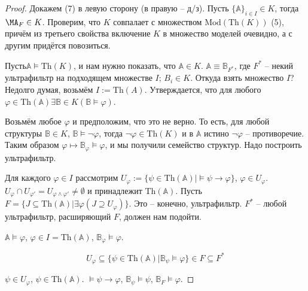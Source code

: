 \begin{proof}
    Докажем (7) в левую сторону (в правую -- д/з). Пусть $\{\mathbb{A}\}_{i \in I} \in K$, тогда $\MA_F \in K$. Проверим, что $K$ совпалает с множеством $\text{Mod}(\text{Th}(K))$ (5), причём из третьего свойства включение $K$ в множество моделей очевидно, а с другим придётся повозиться. \ 
    
    Пусть$\mathbb{A}\models \text{Th}(K)$, и нам нужно показать, что $\mathbb{A}\in K$. $\mathbb{A}\equiv \mathbb{B}_{F^*}$, где $F^*$ -- некий ультрафильтр на подходящем множестве $I$; $B_i \in K$. Откуда взять множество $I$? Недолго думая, возьмём $I:= \text{Th}(A)$. Утверждается, что для любого $\varphi \in \text{Th}(\mathbb{A}) \exists \mathbb{B} \in K (\mathbb{B} \models \varphi)$. \ 

    Возьмём любое $\varphi$ и предположим, что это не верно. То есть, для любой структуры $\mathbb{B} \in K$, $\mathbb{B} \models \neg \varphi$, тогда $\neg \varphi \in \text{Th}(K)$ и в $\mathbb{A}$ истино $\neg \varphi$ -- противоречие. Таким образом $\varphi \mapsto \mathbb{B}_\varphi \models \varphi$, и мы получили семейство структур. Надо построить ультрафильтр. \ 
    
    Для каждого $\varphi \in I$ рассмотрим $U_{\varphi} := \{\psi \in \text{Th}(\mathbb{A}) | \models \psi \rightarrow \varphi\}$, $\varphi \in U_\varphi$. $U_{\varphi} \cap U_{\varphi'} = U_{\varphi \wedge \varphi'} \neq \emptyset$ и принадлежит $\text{Th}(\mathbb{A})$. Пусть $F = \{J \subseteq \text{Th}(\mathbb{A}) | \exists \varphi (J \supseteq U_\varphi)\}$. Это --  конечно, ультрафильтр. $F^*$ -- любой ультрафильтр, расширяющий $F$, должен нам подойти. \ 

    $\mathbb{A}\models \varphi$, $\varphi \in I = \text{Th}(\mathbb{A})$, $\mathbb{B}_\varphi \models \varphi$. 

    \[ 
        U_{\varphi} \subseteq \{\psi \in \text{Th}(\mathbb{A}) | \mathbb{B}_{\psi} \models \varphi\} \in F \subseteq F^*
    \]
    
    $\psi \in U_{\varphi}$, $\psi \in \text{Th}(\mathbb{A})$. $\models \psi \rightarrow \varphi$, $\mathbb{B}_\psi \models \psi$, $\mathbb{B}_F \models \varphi$. 
\end{proof}

